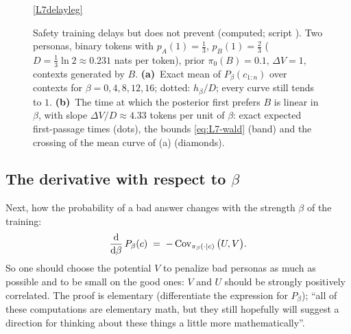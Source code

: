 \begin{figure}[tb]
\par\smallskip\ref{L7delayleg}
\caption{Safety training delays but does not prevent (computed; script ). Two personas, binary tokens with $p_A(1)=\frac13$, $p_B(1)=\frac23$ ($D=\frac13\ln2\approx0.231$ nats per token), prior $\pi_0(B)=0.1$, $\Delta V=1$, contexts generated by $B$. \textbf{(a)}~Exact mean of $P_\beta(c_{1:n})$ over contexts for $\beta=0,4,8,12,16$; dotted: $h_\beta/D$; every curve still tends to $1$. \textbf{(b)}~The time at which the posterior first prefers $B$ is linear in $\beta$, with slope $\Delta V/D\approx4.33$ tokens per unit of $\beta$: exact expected first-passage times (dots), the bounds \eqref{eq:L7-wald} (band) and the crossing of the mean curve of (a) (diamonds).}
\label{fig:L7-delay}
\end{figure}

\subsection{The derivative with respect to \texorpdfstring{$\beta$}{beta}}\label{sec:L7-cov}
Next, how the probability of a bad answer changes with the strength $\beta$ of the training:
\begin{equation}\label{eq:L7-cov}
   \frac{\mathrm{d}}{\mathrm{d}\beta}\,P_\beta(c)\;=\;-\operatorname{Cov}_{\pi_\beta(\cdot\mid c)}\big(U,V\big).
\end{equation}
So one should choose the potential $V$ to penalize bad personas as much as possible and to be small on the good ones: $V$ and $U$ should be strongly positively correlated. The proof is elementary (differentiate the expression for $P_\beta$); ``all of these computations are elementary math, but they still hopefully will suggest a direction for thinking about these things a little more mathematically''.

